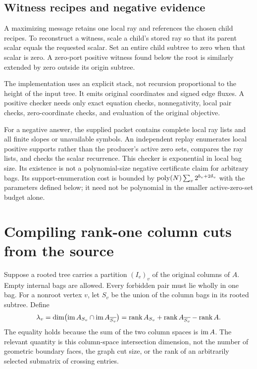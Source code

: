 \subsection{Witness recipes and negative evidence}

A maximizing message retains one local ray and references the chosen child
recipes. To reconstruct a witness, scale a child's stored ray so that its
parent scalar equals the requested scalar. Set an entire child subtree to zero
when that scalar is zero. A zero-port positive witness found below the root is
similarly extended by zero outside its origin subtree.

The implementation uses an explicit stack, not recursion proportional to the
height of the input tree. It emits original coordinates and signed edge fluxes.
A positive checker needs only exact equation checks, nonnegativity, local pair
checks, zero-coordinate checks, and evaluation of the original objective.

For a negative answer, the supplied packet contains complete local ray lists
and all finite slopes or unavailable symbols. An independent replay enumerates
local positive supports rather than the producer's active zero sets, compares
the ray lists, and checks the scalar recurrence. This checker is exponential
in local bag size. Its existence is not a polynomial-size negative certificate
claim for arbitrary bags. Its support-enumeration cost is bounded by
$\operatorname{poly}(N)\sum_v2^{b_v+2\delta_v}$ with the parameters defined below; it need
not be polynomial in the smaller active-zero-set budget alone.

\section{Compiling rank-one column cuts from the source}
\label{sec:compiler}

Suppose a rooted tree carries a partition $(I_v)_v$ of the original columns of
$A$. Empty internal bags are allowed. Every forbidden pair must lie wholly in
one bag. For a nonroot vertex $v$, let $S_v$ be the union of the column bags
in its rooted subtree. Define
\begin{equation}\label{eq:cutrank}
 \lambda_v=\dim\bigl(\operatorname{im} A_{S_v}\cap\operatorname{im} A_{\overline{S_v}}\bigr)
 =\operatorname{rank} A_{S_v}+\operatorname{rank} A_{\overline{S_v}}-\operatorname{rank} A.
\end{equation}
The equality holds because the sum of the two column spaces is $\operatorname{im} A$.
The relevant quantity is this column-space intersection dimension, not the
number of geometric boundary faces, the graph cut size, or the rank of an
arbitrarily selected submatrix of crossing entries.

